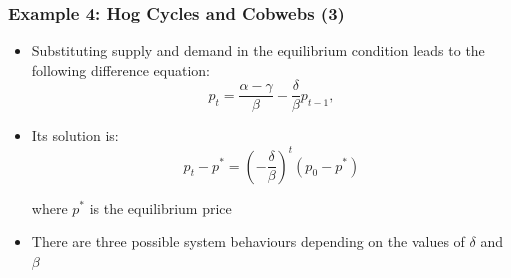 \documentclass[10pt,usenames,dvipsnames]{beamer}
\theoremstyle{definition}
\begin{document}
\begin{frame}[fragile]
\frametitle{Example 4: Hog Cycles and Cobwebs (3)}
\begin{itemize}
	\item Substituting supply and demand in the equilibrium condition leads to the following difference equation:
	\[
		p_{t} = \frac{\alpha - \gamma}{\beta} - \frac{\delta}{\beta}p_{t-1},
	\]
	\item Its solution is:
	\[
		p_{t} - p^{*} = \left(-\frac{\delta}{\beta}\right)^{t}(p_{0} - p^{*})
	\]
	
	where $p^{*}$ is the equilibrium price
	\item There are three possible system behaviours depending on the values of $\delta$ and $\beta$
\end{itemize}
\end{frame}
\end{document}

